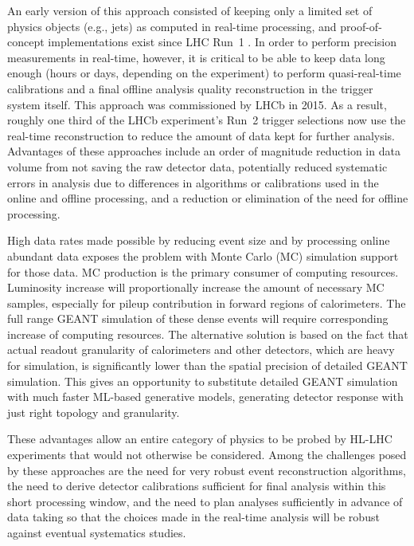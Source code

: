 An early version of this approach consisted of keeping only a limited set of physics objects (e.g., jets) as computed in real-time processing, and proof-of-concept implementations exist since LHC 
Run~1 \cite{Aaij2016,Abreu2014,CMS2016}. In order to perform precision measurements in real-time, however, it is critical to be able to keep data long enough (hours or days, depending on the experiment) 
to perform quasi-real-time calibrations and a final offline analysis quality reconstruction in the trigger system itself. This approach was commissioned by LHCb in 2015. As a result, roughly one 
third of the LHCb experiment’s Run~2 trigger selections now use the real-time reconstruction to reduce the amount of data kept for further analysis. Advantages of these approaches include an order 
of magnitude reduction in data volume from not saving the raw detector data, potentially reduced systematic errors in analysis due to differences in algorithms or calibrations used in the online 
and offline processing, and a reduction or elimination of the need for offline processing. 

High data rates made possible by reducing event size and by processing online abundant data exposes the problem with Monte Carlo (MC) simulation support for those data. MC production is the primary 
consumer of computing resources. Luminosity increase will proportionally increase the amount of necessary MC samples, especially for pileup contribution in forward regions of calorimeters. The full 
range GEANT simulation of these dense events will require corresponding increase of computing resources. The alternative solution is based on the fact that actual readout granularity of calorimeters 
and other detectors, which are heavy for simulation, is significantly lower than the spatial precision of detailed GEANT simulation. This gives an opportunity to substitute detailed GEANT simulation 
with much faster ML-based generative models, generating detector response with just right topology and granularity.

These advantages allow an entire category of physics to be probed by HL-LHC experiments that would not otherwise be considered. Among the challenges posed by these approaches are the need for 
very robust event reconstruction algorithms, the need to derive detector calibrations sufficient for final analysis within this short processing window, and the need to plan analyses sufficiently 
in advance of data taking so that the choices made in the real-time analysis will be robust against eventual systematics studies.

